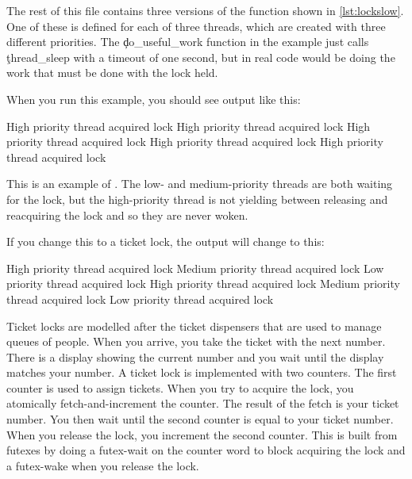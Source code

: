 \codelisting[filename=examples/locking/locking.cc,marker=declare,label=lst:locksdeclare,caption="Declaring a lock in C++"]{}

The rest of this file contains three versions of the function shown in \ref{lst:lockslow}.
One of these is defined for each of three threads, which are created with three different priorities.
The \c{do_useful_work} function in the example just calls \c{thread_sleep} with a timeout of one second, but in real code would be doing the work that must be done with the lock held.

\codelisting[filename=examples/locking/locking.cc,marker=low,label=lst:lockslow,caption="The low-priority thread entry point for the locking example"]{}

When you run this example, you should see output like this:

\begin{console}
High priority thread acquired lock
High priority thread acquired lock
High priority thread acquired lock
High priority thread acquired lock
High priority thread acquired lock
\end{console}

This is an example of .
The low- and medium-priority threads are both waiting for the lock, but the high-priority thread is not yielding between releasing and reacquiring the lock and so they are never woken.

If you change this to a ticket lock, the output will change to this:

\begin{console}
High priority thread acquired lock
Medium priority thread acquired lock
Low priority thread acquired lock
High priority thread acquired lock
Medium priority thread acquired lock
Low priority thread acquired lock
\end{console}

Ticket locks are modelled after the ticket dispensers that are used to manage queues of people.
When you arrive, you take the ticket with the next number.
There is a display showing the current number and you wait until the display matches your number.
A ticket lock is implemented with two counters.
The first counter is used to assign tickets.
When you try to acquire the lock, you atomically fetch-and-increment the counter.
The result of the fetch is your ticket number.
You then wait until the second counter is equal to your ticket number.
When you release the lock, you increment the second counter.
This is built from futexes by doing a futex-wait on the counter word to block acquiring the lock and a futex-wake when you release the lock.


